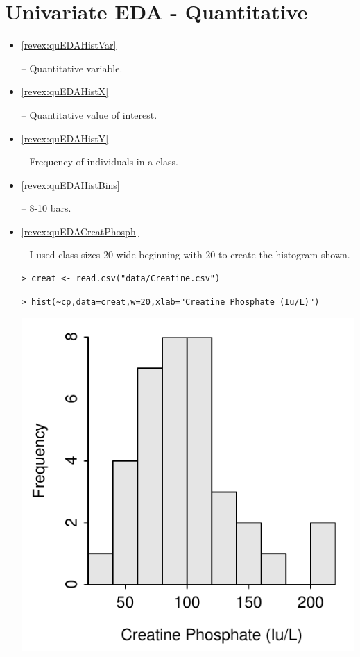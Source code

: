 \documentclass[10pt,openany]{book}\usepackage[]{graphicx}\usepackage[]{color}
\makeatletter
\newenvironment{kframe}{%
 \def\at@end@of@kframe{}%
 \ifinner\ifhmode%
  \def\at@end@of@kframe{\end{minipage}}%
  \begin{minipage}{\columnwidth}%
 \fi\fi%
 \def\FrameCommand##1{\hskip\@totalleftmargin \hskip-\fboxsep
 \colorbox{shadecolor}{##1}\hskip-\fboxsep
     \hskip-\linewidth \hskip-\@totalleftmargin \hskip\columnwidth}%
 \MakeFramed {\advance\hsize-\width
   \@totalleftmargin\z@ \linewidth\hsize
   \@setminipage}}%
 {\par\unskip\endMakeFramed%
 \at@end@of@kframe}
\newenvironment{knitrout}{}{} %
\makeatother
\begin{document}
\section*{Univariate EDA - Quantitative}
\begin{itemize}
  \item \hypertarget{ans:quEDAHistVar}{\ref{revex:quEDAHistVar}} --  Quantitative variable.
  \item \hypertarget{ans:quEDAHistX}{\ref{revex:quEDAHistX}} --  Quantitative value of interest.
  \item \hypertarget{ans:quEDAHistY}{\ref{revex:quEDAHistY}} --  Frequency of individuals in a class.
  \item \hypertarget{ans:quEDAHistBins}{\ref{revex:quEDAHistBins}} --  8-10 bars.
  \item \hypertarget{ans:quEDACreatPhosph}{\ref{revex:quEDACreatPhosph}} -- I used class sizes 20 wide beginning with 20 to create the histogram shown.

\begin{knitrout}
\color{fgcolor}\begin{kframe}
\begin{verbatim}
> creat <- read.csv("data/Creatine.csv")
\end{verbatim}
\end{kframe}
\end{knitrout}
\begin{knitrout}
\color{fgcolor}\begin{kframe}
\begin{verbatim}
> hist(~cp,data=creat,w=20,xlab="Creatine Phosphate (Iu/L)")
\end{verbatim}
\end{kframe}

{\centering \includegraphics[width=.4\linewidth]{Figs/HistCP-1} 

}




\end{knitrout}
\end{itemize}
\end{document}
